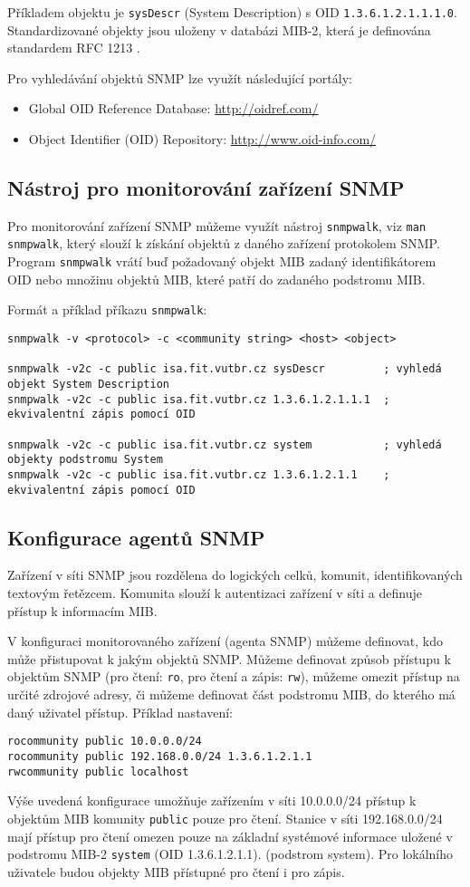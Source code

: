 Příkladem objektu je {\tt sysDescr} (System Description) s OID {\tt 1.3.6.1.2.1.1.1.0}. Standardizované objekty jsou uloženy v databázi MIB-2, která je definována standardem RFC 1213 \cite{rfc1213}.

Pro vyhledávání objektů SNMP lze využít následující portály:
\begin{itemize}
  \item Global OID Reference Database: \url{http://oidref.com/}
  \item Object Identifier (OID) Repository: \url{http://www.oid-info.com/}
\end{itemize}

\subsection{Nástroj pro monitorování zařízení SNMP}
Pro monitorování zařízení SNMP můžeme využít nástroj {\tt snmpwalk}, viz {\tt man snmpwalk}, který slouží k získání objektů z daného zařízení protokolem SNMP. Program {\tt snmpwalk} vrátí buď požadovaný objekt MIB zadaný identifikátorem OID nebo množinu objektů MIB, které patří do zadaného podstromu MIB.

Formát a příklad příkazu {\tt snmpwalk}:
{\small
\begin{verbatim}
snmpwalk -v <protocol> -c <community string> <host> <object>

snmpwalk -v2c -c public isa.fit.vutbr.cz sysDescr         ; vyhledá objekt System Description
snmpwalk -v2c -c public isa.fit.vutbr.cz 1.3.6.1.2.1.1.1  ; ekvivalentní zápis pomocí OID

snmpwalk -v2c -c public isa.fit.vutbr.cz system           ; vyhledá objekty podstromu System
snmpwalk -v2c -c public isa.fit.vutbr.cz 1.3.6.1.2.1.1    ; ekvivalentní zápis pomocí OID
\end{verbatim}
}

\subsection{Konfigurace agentů SNMP}
Zařízení v síti SNMP jsou rozdělena do logických celků, komunit, identifikovaných textovým  řetězcem. Komunita slouží k autentizaci zařízení v síti a definuje přístup k informacím MIB.

V konfiguraci monitorovaného zařízení (agenta SNMP) můžeme definovat, kdo může přistupovat k jakým objektů SNMP. Můžeme definovat způsob přístupu k objektům SNMP (pro čtení: {\tt ro},  pro čtení a zápis: {\tt rw}), můžeme omezit přístup na určité zdrojové adresy, či můžeme definovat část podstromu MIB, do kterého má daný uživatel přístup.  
Příklad nastavení: 
\begin{verbatim}
rocommunity public 10.0.0.0/24
rocommunity public 192.168.0.0/24 1.3.6.1.2.1.1
rwcommunity public localhost
\end{verbatim}
Výše uvedená konfigurace umožňuje zařízením v síti 10.0.0.0/24 přístup k objektům MIB komunity {\tt public} pouze
 pro čtení. Stanice v síti 192.168.0.0/24 mají přístup pro čtení omezen pouze na základní systémové informace uložené v podstromu MIB-2 {\tt system} (OID 1.3.6.1.2.1.1). 
 (podstrom system). Pro lokálního uživatele budou objekty MIB přístupné pro čtení i pro zápis.


